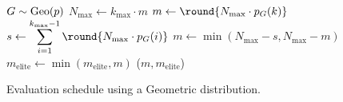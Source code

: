 \begin{algorithm}[ht]
  \begin{algorithmic}
    \State $G \sim \operatorname{Geo}(p)$
    \State $N_\text{max} \leftarrow k_\text{max} \cdot m$
    \State $m \leftarrow \round{N_\text{max} \cdot p_G(k)}$
        \State $s \leftarrow \displaystyle\sum_{i=1}^{k_\text{max}-1} \round{N_\text{max} \cdot p_G(i)}$
        \State $m \leftarrow \min(N_\text{max} - s, N_\text{max} - m)$
    \EndIf
    \State $m_\text{elite} \leftarrow \min(m_\text{elite}, m)$
    \State \Return ($m, m_\text{elite}$) 
  \EndFunction
  \end{algorithmic}
  \caption{\label{alg:evaluation_schedule} Evaluation schedule using a Geometric distribution.}
\end{algorithm}

